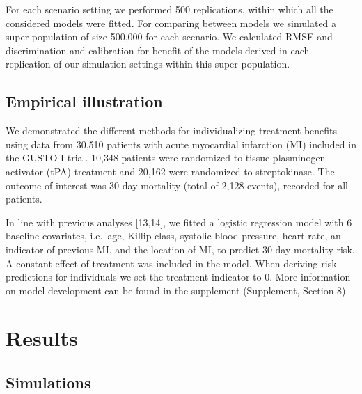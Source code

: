 \documentclass[]{elsarticle} %
\begin{document}
For each scenario setting we performed 500 replications, within which
all the considered models were fitted. For comparing between models we
simulated a super-population of size 500,000 for each scenario. We
calculated RMSE and discrimination and calibration for benefit of the
models derived in each replication of our simulation settings within
this super-population.

\hypertarget{empirical-illustration}{%
\subsection{Empirical illustration}\label{empirical-illustration}}

We demonstrated the different methods for individualizing treatment
benefits using data from 30,510 patients with acute myocardial
infarction (MI) included in the GUSTO-I trial. 10,348 patients were
randomized to tissue plasminogen activator (tPA) treatment and 20,162
were randomized to streptokinase. The outcome of interest was 30-day
mortality (total of 2,128 events), recorded for all patients.

In line with previous analyses {[}13,14{]}, we fitted a logistic
regression model with 6 baseline covariates, i.e.~age, Killip class,
systolic blood pressure, heart rate, an indicator of previous MI, and
the location of MI, to predict 30-day mortality risk. A constant effect
of treatment was included in the model. When deriving risk predictions
for individuals we set the treatment indicator to 0. More information on
model development can be found in the supplement (Supplement, Section
8).

\hypertarget{results}{%
\section{Results}\label{results}}

\hypertarget{simulations}{%
\subsection{Simulations}\label{simulations}}
\end{document}
